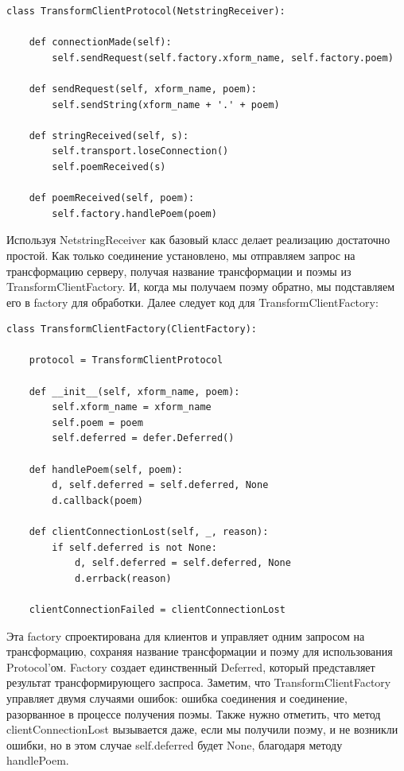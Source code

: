 \begin{scriptsize}\begin{verbatim} 
class TransformClientProtocol(NetstringReceiver):

    def connectionMade(self):
        self.sendRequest(self.factory.xform_name, self.factory.poem)

    def sendRequest(self, xform_name, poem):
        self.sendString(xform_name + '.' + poem)

    def stringReceived(self, s):
        self.transport.loseConnection()
        self.poemReceived(s)

    def poemReceived(self, poem):
        self.factory.handlePoem(poem)
\end{verbatim}\end{scriptsize}


Используя NetstringReceiver как базовый класс 
делает реализацию достаточно простой. Как только 
соединение установлено, мы отправляем запрос на 
трансформацию серверу, получая название трансформации 
и поэмы из TransformClientFactory. И, когда мы получаем поэму 
обратно, мы подставляем его в factory для обработки. 
Далее следует код для TransformClientFactory:

\begin{scriptsize}\begin{verbatim}
class TransformClientFactory(ClientFactory):

    protocol = TransformClientProtocol

    def __init__(self, xform_name, poem):
        self.xform_name = xform_name
        self.poem = poem
        self.deferred = defer.Deferred()

    def handlePoem(self, poem):
        d, self.deferred = self.deferred, None
        d.callback(poem)

    def clientConnectionLost(self, _, reason):
        if self.deferred is not None:
            d, self.deferred = self.deferred, None
            d.errback(reason)

    clientConnectionFailed = clientConnectionLost
\end{verbatim}\end{scriptsize}


Эта factory спроектирована для клиентов и управляет 
одним запросом на трансформацию, сохраняя название 
трансформации и поэму для использования Protocol'ом. 
Factory создает единственный Deferred, 
который представляет результат трансформирующего заспроса. 
Заметим, что TransformClientFactory управляет двумя случаями ошибок: 
ошибка соединения и соединение, разорванное в процессе 
получения поэмы. Также нужно отметить, что метод clientConnectionLost 
вызывается даже, если мы получили поэму, и не возникли ошибки, 
но в этом случае self.deferred будет None, благодаря методу handlePoem.


